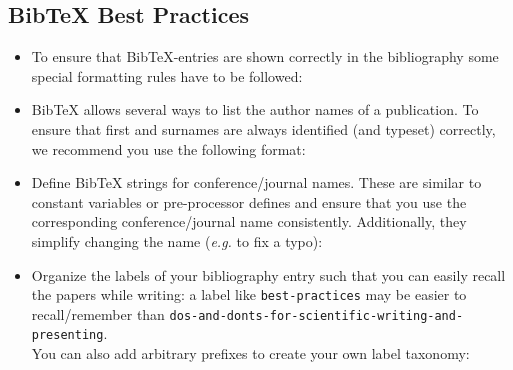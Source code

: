 \documentclass[11pt,a4paper]{article}
\begin{document}
\subsection{BibTeX Best Practices}
\label{sec-bibtex-extras}
\begin{itemize}
\item To ensure that BibTeX-entries are shown correctly in the bibliography some
special formatting rules have to be followed:
% 

\item BibTeX allows several ways to list the author names of a publication.
To ensure that first and surnames are always identified (and typeset) correctly, we recommend you use the following format:
% 

\item Define BibTeX strings for conference/journal names. These are similar to constant variables or pre-processor defines and ensure that you use the corresponding conference/journal name consistently. Additionally, they simplify changing the name (\emph{e.g.} to fix a typo):
% 

\item Organize the labels of your bibliography entry such that you can easily recall the papers while writing: a label like \texttt{best-practices} may be easier to recall/remember than \texttt{dos-and-donts-for-scientific-writing-and-presenting}.\\You can also add arbitrary prefixes to create your own label taxonomy:
%

\end{itemize}
\end{document}
